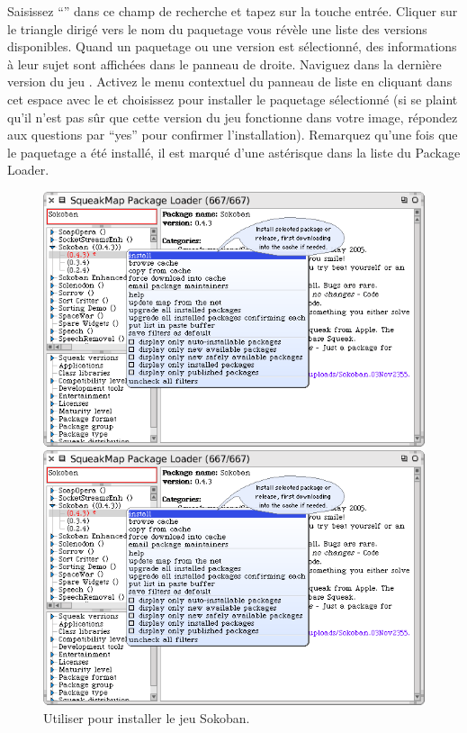 \documentclass[a4paper,10pt,twoside]{book}
\begin{document}
Saisissez ``'' dans ce champ de recherche et
  tapez sur la touche entr\'ee.
Cliquer sur le triangle dirig\'e vers le nom du paquetage vous
r\'ev\`ele une liste des versions disponibles. Quand un paquetage ou
une version est s\'electionn\'e, des informations \`a leur sujet sont
affich\'ees dans le panneau de droite.
Naviguez dans la derni\`ere version du jeu .
Activez le menu contextuel du panneau de liste en cliquant dans cet
espace avec le  et choisissez  pour
installer le paquetage s\'electionn\'e
(si \sq se plaint qu'il n'est pas s\^ur que cette version du jeu
fonctionne dans votre image, r\'epondez aux questions par ``yes'' 
pour confirmer l'installation).
Remarquez qu'une fois que le paquetage a \'et\'e install\'e, il est
marqu\'e d'une ast\'erisque dans la liste du \sqmap Package Loader.

\begin{figure}[htb]
\ifluluelse
	{\centerline {\includegraphics[width=\textwidth]{SqueakMap}}}
	{\centerline {\includegraphics[scale=0.7]{SqueakMap}}}
\caption{Utiliser \sqmap pour installer le jeu Sokoban.\label{fig:sokoban}}
\end{figure}
\end{document}
